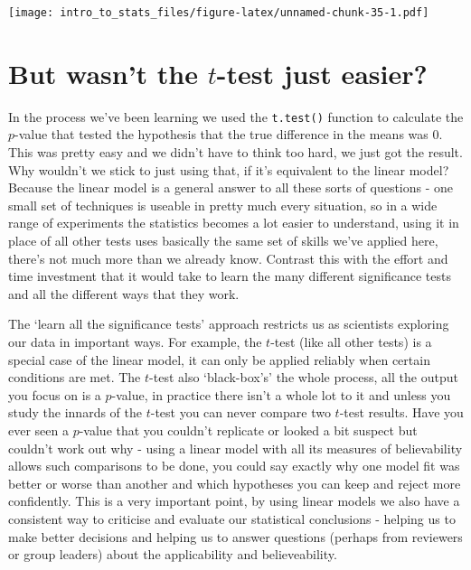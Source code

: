 \documentclass[]{book}
\begin{document}
\texttt{[image: intro\_to\_stats\_files/figure-latex/unnamed-chunk-35-1.pdf]}

\hypertarget{but-wasnt-the-t-test-just-easier}{%
\section{\texorpdfstring{But wasn't the \(t\)-test just easier?}{But wasn't the t-test just easier?}}\label{but-wasnt-the-t-test-just-easier}}

In the process we've been learning we used the \texttt{t.test()} function to calculate the \(p\)-value that tested the hypothesis that the true difference in the means was 0. This was pretty easy and we didn't have to think too hard, we just got the result. Why wouldn't we stick to just using that, if it's equivalent to the linear model? Because the linear model is a general answer to all these sorts of questions - one small set of techniques is useable in pretty much every situation, so in a wide range of experiments the statistics becomes a lot easier to understand, using it in place of all other tests uses basically the same set of skills we've applied here, there's not much more than we already know. Contrast this with the effort and time investment that it would take to learn the many different significance tests and all the different ways that they work.

The `learn all the significance tests' approach restricts us as scientists exploring our data in important ways. For example, the \(t\)-test (like all other tests) is a special case of the linear model, it can only be applied reliably when certain conditions are met. The \(t\)-test also `black-box's' the whole process, all the output you focus on is a \(p\)-value, in practice there isn't a whole lot to it and unless you study the innards of the \(t\)-test you can never compare two \(t\)-test results. Have you ever seen a \(p\)-value that you couldn't replicate or looked a bit suspect but couldn't work out why - using a linear model with all its measures of believability allows such comparisons to be done, you could say exactly why one model fit was better or worse than another and which hypotheses you can keep and reject more confidently. This is a very important point, by using linear models we also have a consistent way to criticise and evaluate our statistical conclusions - helping us to make better decisions and helping us to answer questions (perhaps from reviewers or group leaders) about the applicability and believeability.
\end{document}
